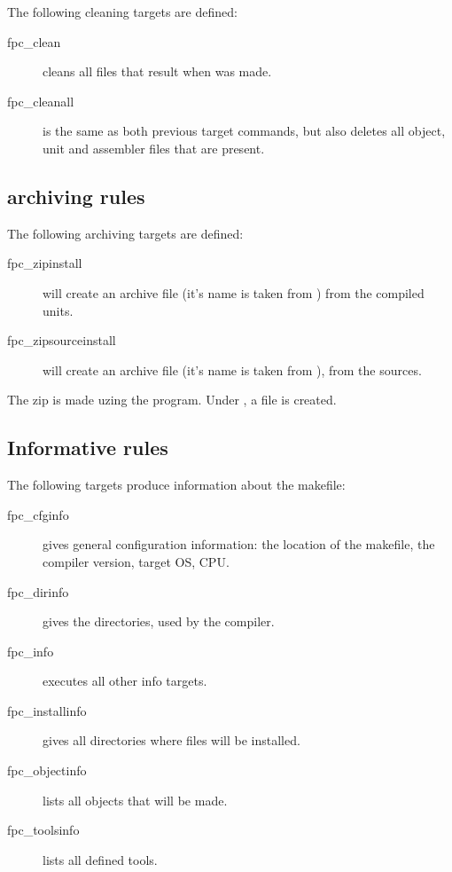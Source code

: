 The following cleaning targets are defined:
\begin{description}
\item[fpc\_clean] cleans all files that result when  was made.
\item[fpc\_cleanall] is the same as both previous target commands, but also
deletes all object, unit and assembler files that are present.
\end{description}

\subsection{archiving rules}

The following archiving targets are defined:
\begin{description}
\item[fpc\_zipinstall] will create an archive file (it's
name is taken from ) from the compiled units.
\item[fpc\_zipsourceinstall] will create an archive file (it's
name is taken from ), from the sources.
\end{description}
The zip is made uzing the  program. Under \linux, a
 file is created.
\subsection{Informative rules}

The following targets produce information about the makefile:
\begin{description}
\item[fpc\_cfginfo] gives general configuration information: the location of
the makefile, the compiler version, target OS, CPU.
\item[fpc\_dirinfo] gives the directories, used by the compiler.
\item[fpc\_info] executes all other info targets.
\item[fpc\_installinfo] gives all directories where files will be installed.
\item[fpc\_objectinfo] lists all objects that will be made.
\item[fpc\_toolsinfo] lists all defined tools.
\end{description}


